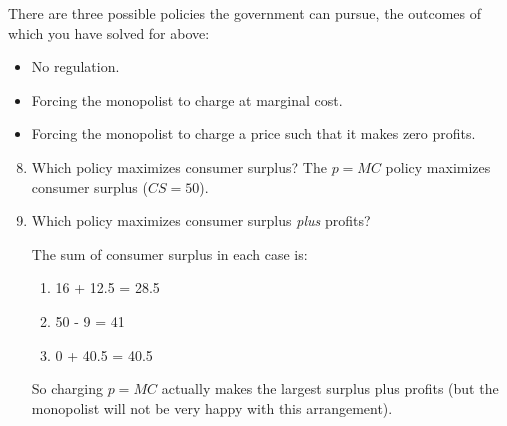 \documentclass[12pt]{article}
\newcounter{question}[section]
\newenvironment{subquestions}{
  \begin{enumerate}[label=(\roman*)]}{\end{enumerate}}
\begin{document}
There are three possible policies the government can pursue, the outcomes of
which you have solved for above:
    \begin{itemize}
      \item No regulation.
      \item Forcing the monopolist to charge at marginal cost.
      \item Forcing the monopolist to charge a price such that it makes zero
        profits.
    \end{itemize}
\begin{subquestions}
  \setcounter{enumi}{7}
  \item Which policy maximizes consumer surplus?
    \textcolor{solution-color}{
      The $p=MC$ policy maximizes consumer surplus ($CS=50$).
    }
  \item Which policy maximizes consumer surplus \emph{plus} profits?
    \textcolor{solution-color}{
      The sum of consumer surplus in each case is:
      \begin{enumerate}
        \item 16 + 12.5 = 28.5
        \item 50 - 9 = 41
        \item 0 + 40.5 = 40.5
      \end{enumerate}
      So charging $p=MC$ actually makes the largest surplus plus profits (but
      the monopolist will not be very happy with this arrangement).
    }
\end{subquestions}
\end{document}
